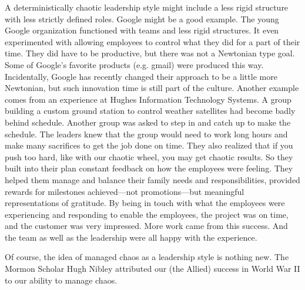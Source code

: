 \documentclass{article}
\begin{document}
A deterministically chaotic leadership style might include a less rigid
structure with less strictly defined roles. Google might be a good example.
The young Google organization functioned with teams and less rigid
structures. It even experimented with allowing employees to control what
they did for a part of their time. They did have to be productive, but there
was not a Newtonian type goal. Some of Google's favorite products (e.g.
gmail) were produced this way. Incidentally, Google has recently changed
their approach to be a little more Newtonian, but such innovation time is
still part of the culture. Another example comes from an experience at
Hughes Information Technology Systems. A group building a custom ground
station to control weather satellites had become badly behind schedule.
Another group was asked to step in and catch up to make the schedule. The
leaders knew that the group would need to work long hours and make many
sacrifices to get the job done on time. They also realized that if you push
too hard, like with our chaotic wheel, you may get chaotic results. So they
built into their plan constant feedback on how the employees were feeling.
They helped them manage and balance their family needs and responsibilities,
provided rewards for milestones achieved---not promotions---but meaningful
representations of gratitude. By being in touch with what the employees were
experiencing and responding to enable the employees, the project was on
time, and the customer was very impressed. More work came from this success.
And the team as well as the leadership were all happy with the experience.%

Of course, the idea of managed chaos as a leadership style is nothing new.
The Mormon Scholar Hugh Nibley attributed our (the Allied) success in World
War II to our ability to manage chaos.

\end{document}

